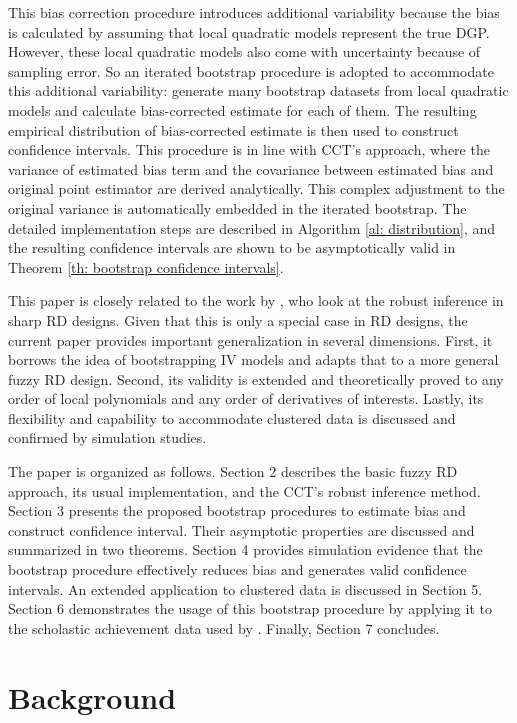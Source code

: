 \documentclass[12pt,]{article}
\DeclareMathOperator{\1}{\mathbbm{1}}
\begin{document}
This bias correction procedure introduces additional variability because the bias is calculated by assuming that local quadratic models represent the true DGP. However, these local quadratic models also come with uncertainty because of sampling error. So an iterated bootstrap procedure \citep{hall1988bootstrap} is adopted to accommodate this additional variability: generate many bootstrap datasets from local quadratic models and calculate bias-corrected estimate for each of them. The resulting empirical distribution of bias-corrected estimate is then used to construct confidence intervals. This procedure is in line with CCT's approach, where the variance of estimated bias term and the covariance between estimated bias and original point estimator are derived analytically. This complex adjustment to the original variance is automatically embedded in the iterated bootstrap. The detailed implementation steps are described in Algorithm \ref{al: distribution}, and the resulting confidence intervals are shown to be asymptotically valid in Theorem \ref{th: bootstrap confidence intervals}.

This paper is closely related to the work by \cite{bartalotti2016bootstrap}, who look at the robust inference in sharp RD designs. Given that this is only a special case in RD designs, the current paper provides important generalization in several dimensions. First, it borrows the idea of bootstrapping IV models and adapts that to a more general fuzzy RD design. Second, its validity is extended and theoretically proved to any order of local polynomials and any order of derivatives of interests. Lastly, its flexibility and capability to accommodate clustered data is discussed and confirmed by simulation studies. 

The paper is organized as follows. Section 2 describes the basic fuzzy RD approach, its usual implementation, and the CCT's robust inference method. Section 3 presents the proposed bootstrap procedures to estimate bias and construct confidence interval. Their asymptotic properties are discussed and summarized in two theorems. Section 4 provides simulation evidence that the bootstrap procedure effectively reduces bias and generates valid confidence intervals. An extended application to clustered data is discussed in Section 5. Section 6 demonstrates the usage of this bootstrap procedure by applying it to the scholastic achievement data used by \cite{angrist1999using}. Finally, Section 7 concludes.


\section{Background}
\label{se: background}
\end{document}
